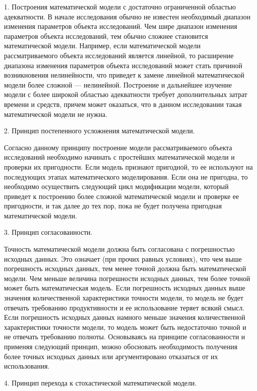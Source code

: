 1. Построения математической модели с достаточно ограниченной областью адекватности. В начале исследования обычно не известен необходимый диапазон изменения параметров объекта исследований. Чем шире диапазон изменения параметров объекта исследований, тем обычно сложнее становится математической модели. Например, если математической модели рассматриваемого объекта исследований является линейной, то расширение диапазона изменения параметров объекта исследований может стать причиной возникновения нелинейности, что приведет к замене линейной математической модели более сложной — нелинейной. Построение и дальнейшее изучение модели с более широкой областью адекватности требует дополнительных затрат времени и средств, причем может оказаться, что в данном исследовании такая математической модели не нужна. 


2. Принцип постепенного усложнения математической модели. 


Согласно данному принципу построение модели рассматриваемого объекта исследований необходимо начинать с простейших математической модели и проверки их пригодности. Если модель признают пригодной, то ее используют на последующих этапах математического моделирования. Если она не пригодна, то необходимо осуществить следующий цикл модификации модели, который приведет к построению более сложной математической модели и проверке ее пригодности, и так далее до тех пор, пока не будет получена пригодная математической модели. 


3. Принцип согласованности. 

Точность математической модели должна быть согласована с погрешностью исходных данных. Это означает (при прочих равных условиях), что чем выше погрешность исходных данных, тем менее точной должна быть математической модели. Чем меньше величина погрешности исходных данных, тем более точной может быть математическая модель.
Если погрешность исходных данных выше значения количественной характеристики точности модели, то модель не будет отвечать требованию продуктивности и ее использование теряет всякий смысл. Если погрешность исходных данных намного меньше значения количественной характеристики точности модели, то модель может быть недостаточно точной и не отвечать требованию полноты.
Основываясь на принципе согласованности и применяя следующий принцип, можно обосновать необходимость получения более точных исходных данных или аргументировано отказаться от их использования.


4. Принцип перехода к стохастической математической модели.

